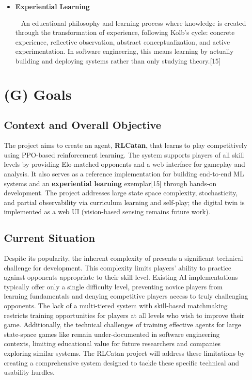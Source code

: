 \documentclass{article}
\begin{document}
\begin{itemize}
    \item \hypertarget{glossary-experiential}{\textbf{Experiential Learning}} – An educational philosophy and learning process where knowledge is created through the transformation of experience, following Kolb's cycle: concrete experience, reflective observation, abstract conceptualization, and active experimentation. In software engineering, this means learning by actually building and deploying systems rather than only studying theory.[15]
\end{itemize}



\section*{(G) Goals}\label{sec:srs-goals}
\renewcommand{\thesubsection}{G.\arabic{subsection}}
\renewcommand{\theHsubsection}{G.\arabic{subsection}}
\setcounter{subsection}{0}

\subsection{Context and Overall Objective}\label{subsec:context-and-overall-objective}
The project aims to create an \AI{} agent, \textbf{RLCatan}, that learns to play \emph{\Catan{}} competitively using PPO-based reinforcement learning. The system supports players of all skill levels by providing Elo-matched opponents and a web interface for gameplay and analysis. It also serves as a reference implementation for building end-to-end ML systems and an \textbf{experiential learning} exemplar[15] through hands-on development. The project addresses large state space complexity, stochasticity, and partial observability via curriculum learning and self-play; the digital twin is implemented as a web UI (vision-based sensing remains future work).

\subsection{Current Situation}\label{subsec:current-situation}
Despite its popularity, the inherent complexity of \emph{\Catan{}} presents a significant technical challenge for \AI{} development. This complexity limits players' ability to practice against opponents appropriate to their skill level. Existing \emph{\Catan{}} AI implementations typically offer only a single difficulty level, preventing novice players from learning fundamentals and denying competitive players access to truly challenging opponents. The lack of a multi-tiered \AI{} system with skill-based matchmaking restricts training opportunities for players at all levels who wish to improve their game. Additionally, the technical challenges of training effective \AI{} agents for large state-space games like \emph{\Catan{}} remain under-documented in software engineering contexts, limiting educational value for future researchers and companies exploring similar \AI{} systems. The RLCatan project will address these limitations by creating a comprehensive system designed to tackle these specific technical and usability hurdles.
\end{document}
